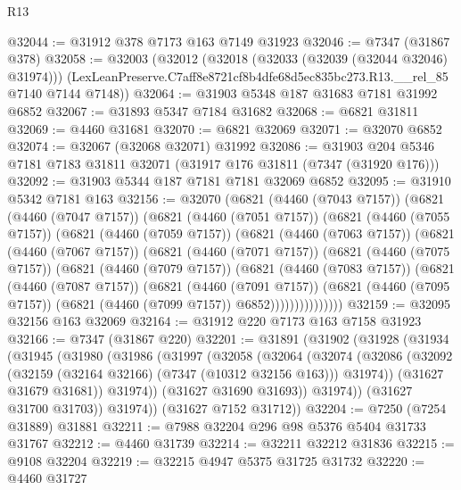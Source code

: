 \begin{lexlean}{R13}
\begin{coremodule}
@32044 := @31912 @378 @7173 @163 @7149 @31923
@32046 := @7347 (@31867 @378)
@32058 := @32003
    (@32012
      (@32018 (@32033 (@32039 (@32044 @32046) @31974)))
      (LexLeanPreserve.C7aff8e8721cf8b4dfe68d5ec835bc273.R13.__rel_85 @7140 @7144 @7148))
@32064 := @31903 @5348 @187 @31683 @7181 @31992 @6852
@32067 := @31893 @5347 @7184 @31682
@32068 := @6821 @31811
@32069 := @4460 @31681
@32070 := @6821 @32069
@32071 := @32070 @6852
@32074 := @32067 (@32068 @32071) @31992
@32086 := @31903 @204 @5346 @7181 @7183 @31811 @32071 (@31917 @176 @31811 (@7347 (@31920 @176)))
@32092 := @31903 @5344 @187 @7181 @7181 @32069 @6852
@32095 := @31910 @5342 @7181 @163
@32156 := @32070
    (@6821
      (@4460 (@7043 @7157))
      (@6821
        (@4460 (@7047 @7157))
        (@6821
          (@4460 (@7051 @7157))
          (@6821
            (@4460 (@7055 @7157))
            (@6821
              (@4460 (@7059 @7157))
              (@6821
                (@4460 (@7063 @7157))
                (@6821
                  (@4460 (@7067 @7157))
                  (@6821
                    (@4460 (@7071 @7157))
                    (@6821
                      (@4460 (@7075 @7157))
                      (@6821
                        (@4460 (@7079 @7157))
                        (@6821
                          (@4460 (@7083 @7157))
                          (@6821
                            (@4460 (@7087 @7157))
                            (@6821
                              (@4460 (@7091 @7157))
                              (@6821
                                (@4460 (@7095 @7157))
                                (@6821 (@4460 (@7099 @7157)) @6852)))))))))))))))
@32159 := @32095 @32156 @163 @32069
@32164 := @31912 @220 @7173 @163 @7158 @31923
@32166 := @7347 (@31867 @220)
@32201 := @31891
    (@31902
      (@31928
        (@31934
          (@31945
            (@31980
              (@31986
                (@31997
                  (@32058
                    (@32064
                      (@32074
                        (@32086
                          (@32092 (@32159 (@32164 @32166) (@7347 (@10312 @32156 @163))) @31974))
                        (@31627 @31679 @31681))
                      @31974))
                  (@31627 @31690 @31693))
                @31974))
            (@31627 @31700 @31703))
          @31974))
      (@31627 @7152 @31712))
@32204 := @7250 (@7254 @31889) @31881
@32211 := @7988 @32204 @296 @98 @5376 @5404 @31733 @31767
@32212 := @4460 @31739
@32214 := @32211 @32212 @31836
@32215 := @9108 @32204
@32219 := @32215 @4947 @5375 @31725 @31732
@32220 := @4460 @31727

\end{coremodule}
\end{lexlean}
